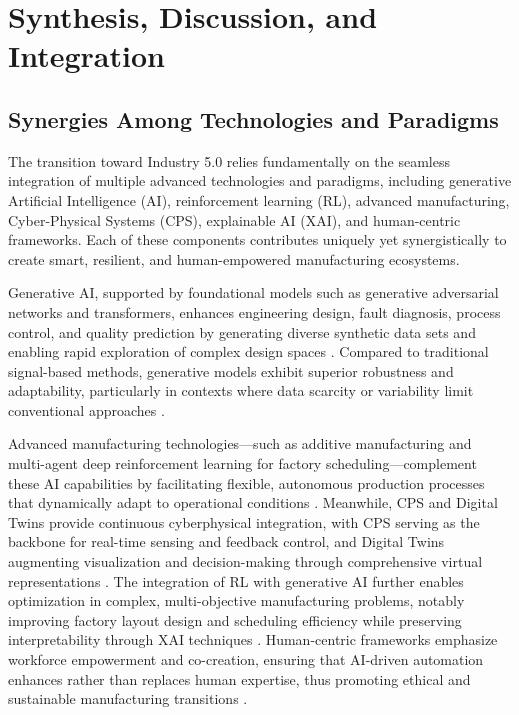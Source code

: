 \documentclass[sigconf]{acmart}
\begin{document}
\section{Synthesis, Discussion, and Integration}

\subsection{Synergies Among Technologies and Paradigms}

The transition toward Industry 5.0 relies fundamentally on the seamless integration of multiple advanced technologies and paradigms, including generative Artificial Intelligence (AI), reinforcement learning (RL), advanced manufacturing, Cyber-Physical Systems (CPS), explainable AI (XAI), and human-centric frameworks. Each of these components contributes uniquely yet synergistically to create smart, resilient, and human-empowered manufacturing ecosystems.

Generative AI, supported by foundational models such as generative adversarial networks and transformers, enhances engineering design, fault diagnosis, process control, and quality prediction by generating diverse synthetic data sets and enabling rapid exploration of complex design spaces \cite{ref1}. Compared to traditional signal-based methods, generative models exhibit superior robustness and adaptability, particularly in contexts where data scarcity or variability limit conventional approaches \cite{ref4}. 

Advanced manufacturing technologies—such as additive manufacturing and multi-agent deep reinforcement learning for factory scheduling—complement these AI capabilities by facilitating flexible, autonomous production processes that dynamically adapt to operational conditions \cite{ref16}. Meanwhile, CPS and Digital Twins provide continuous cyberphysical integration, with CPS serving as the backbone for real-time sensing and feedback control, and Digital Twins augmenting visualization and decision-making through comprehensive virtual representations \cite{ref23}. The integration of RL with generative AI further enables optimization in complex, multi-objective manufacturing problems, notably improving factory layout design and scheduling efficiency while preserving interpretability through XAI techniques \cite{ref12}. Human-centric frameworks emphasize workforce empowerment and co-creation, ensuring that AI-driven automation enhances rather than replaces human expertise, thus promoting ethical and sustainable manufacturing transitions \cite{ref2}.
\end{document}
